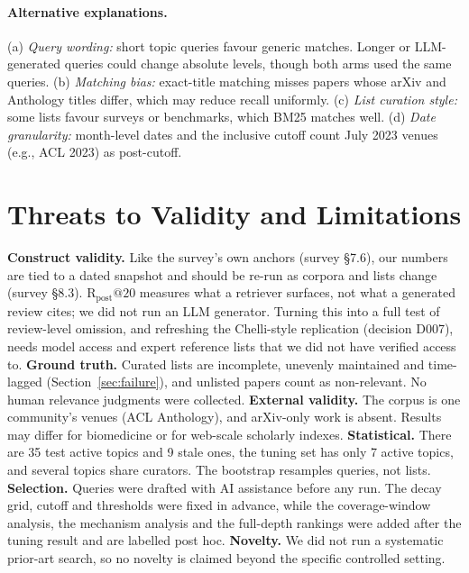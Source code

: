 \documentclass[acmsmall]{acmart}
\makeatletter
\newcommand{\Rpost}{\mathrm{R}_{\text{post}}@20}
\makeatother
\begin{document}
\paragraph{Alternative explanations.} (a) \emph{Query wording:} short topic queries favour generic matches. Longer or LLM-generated queries could change absolute levels, though both arms used the same queries. (b) \emph{Matching bias:} exact-title matching misses papers whose arXiv and Anthology titles differ, which may reduce recall uniformly. (c) \emph{List curation style:} some lists favour surveys or benchmarks, which BM25 matches well. (d) \emph{Date granularity:} month-level dates and the inclusive cutoff count July 2023 venues (e.g., ACL 2023) as post-cutoff.

\section{Threats to Validity and Limitations}\label{sec:limits}
\textbf{Construct validity.} Like the survey's own anchors (survey \S7.6), our numbers are tied to a dated snapshot and should be re-run as corpora and lists change (survey \S8.3). $\Rpost$ measures what a retriever surfaces, not what a generated review cites; we did not run an LLM generator. Turning this into a full test of review-level omission, and refreshing the Chelli-style replication (decision D007), needs model access and expert reference lists that we did not have verified access to. \textbf{Ground truth.} Curated lists are incomplete, unevenly maintained and time-lagged (Section~\ref{sec:failure}), and unlisted papers count as non-relevant. No human relevance judgments were collected. \textbf{External validity.} The corpus is one community's venues (ACL Anthology), and arXiv-only work is absent. Results may differ for biomedicine or for web-scale scholarly indexes. \textbf{Statistical.} There are 35 test active topics and 9 stale ones, the tuning set has only 7 active topics, and several topics share curators. The bootstrap resamples queries, not lists. \textbf{Selection.} Queries were drafted with AI assistance before any run. The decay grid, cutoff and thresholds were fixed in advance, while the coverage-window analysis, the mechanism analysis and the full-depth rankings were added after the tuning result and are labelled post hoc. \textbf{Novelty.} We did not run a systematic prior-art search, so no novelty is claimed beyond the specific controlled setting.
\end{document}

